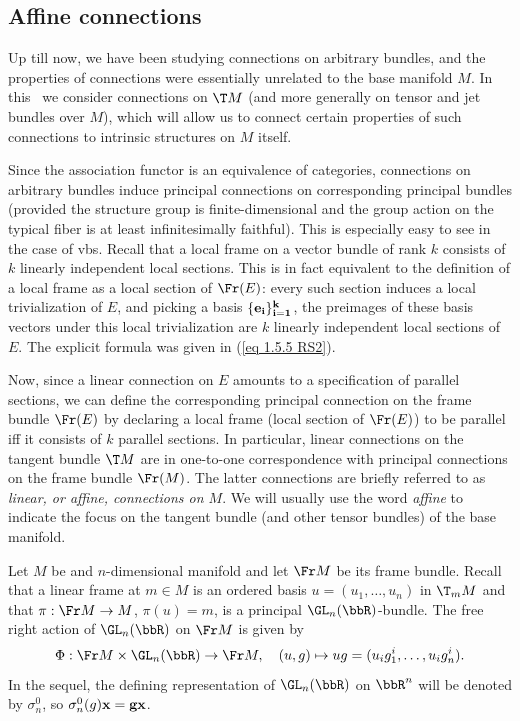 \subsection{Affine connections}

Up till now, we have been studying connections on arbitrary bundles, and the properties of connections were essentially unrelated to the base manifold $M$. In this \subsect\ we consider connections on $\T M$ (and more generally on tensor and jet bundles over $M$), which will allow us to connect certain properties of such connections to intrinsic structures on $M$ itself.

Since the association functor is an equivalence of categories, connections on arbitrary bundles induce principal connections on corresponding principal bundles (provided the structure group is finite-dimensional and the group action on the typical fiber is at least infinitesimally faithful). This is especially easy to see in the case of \glspl{vb}. Recall that a local frame on a vector bundle of rank $k$ consists of $k$ linearly independent local sections. This is in fact equivalent to the definition of a local frame as a local section of $\Fr(E)$: every such section induces a local trivialization of $E$, and picking a basis $\{\bf{e}_i\}_{i=1}^k$, the preimages of these basis vectors under this local trivialization are $k$ linearly independent local sections of $E$. The explicit formula was given in (\ref{eq 1.5.5 RS2}).

Now, since a linear connection on $E$ amounts to a specification of parallel sections, we can define the corresponding principal connection on the frame bundle $\Fr(E)$ by declaring a local frame (local section of $\Fr(E)$) to be parallel iff it consists of $k$ parallel sections. In particular, linear connections on the tangent bundle $\T M$ are in one-to-one correspondence with principal connections on the frame bundle $\Fr(M)$. The latter connections are briefly referred to as \emph{linear, or affine, connections on $M$}. We will usually use the word \emph{affine} to indicate the focus on the tangent bundle (and other tensor bundles) of the base manifold.

Let $M$ be and $n$-dimensional manifold and let $\Fr M$ be its frame bundle. Recall that a linear frame at $m\in M$ is an ordered basis $u=(u_1,\ldots,u_n)$ in $\T_m M$ and that $\pi:\Fr M\to M$, $\pi(u)=m$, is a principal $\GL_n(\bbR)$-bundle. The free right action of $\GL_n(\bbR)$ on $\Fr M$ is given by
\[\Phi:\Fr M\times \GL_n(\bbR)\to \Fr M,\quad (u,g)\mapsto ug=(u_ig^i_1,\ldots,u_ig^i_n).\]
In the sequel, the defining representation of $\GL_n(\bbR)$ on $\bbR^n$ will be denoted by $\sigma^0_n$, so $\sigma^0_n(g)\bf{x}=g\bf{x}$.



